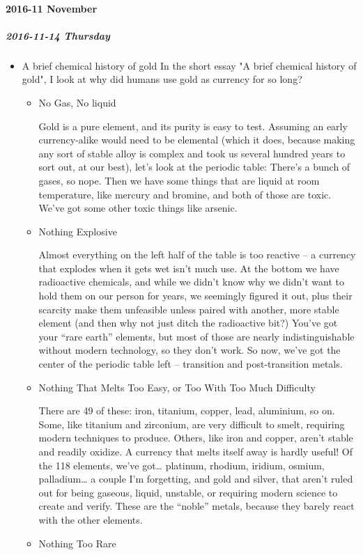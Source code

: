 \documentclass[11pt]{article}
\begin{document}
\paragraph*{2016-11 November}
\label{sec:org72089d9}
\startcontents[level-4]
\subparagraph*{2016-11-14 Thursday}
\label{sec:org6317ebd}
\begin{itemize}
\item A brief chemical history of gold
\label{sec:orgc4d97cb}
In the short essay "A brief chemical history of gold", I look at why did humans use gold as currency for so long?
\begin{itemize}
\item No Gas, No liquid
\label{sec:org07710a9}

Gold is a pure element, and its purity is easy to test. Assuming an early currency-alike would need to be elemental (which it does, because making any sort of stable alloy is complex and took us several hundred years to sort out, at our best), let’s look at the periodic table: There’s a bunch of gases, so nope. Then we have some things that are liquid at room temperature, like mercury and bromine, and both of those are toxic. We’ve got some other toxic things like arsenic.
\item Nothing Explosive
\label{sec:orga9853b1}

Almost everything on the left half of the table is too reactive – a currency that explodes when it gets wet isn’t much use. At the bottom we have radioactive chemicals, and while we didn’t know why we didn’t want to hold them on our person for years, we seemingly figured it out, plus their scarcity make them unfeasible unless paired with another, more stable element (and then why not just ditch the radioactive bit?) You’ve got your “rare earth” elements, but most of those are nearly indistinguishable without modern technology, so they don’t work. So now, we’ve got the center of the periodic table left – transition and post-transition metals.
\item Nothing That Melts Too Easy, or Too With Too Much Difficulty
\label{sec:org58afaac}

There are 49 of these: iron, titanium, copper, lead, aluminium, so on. Some, like titanium and zirconium, are very difficult to smelt, requiring modern techniques to produce. Others, like iron and copper, aren’t stable and readily oxidize. A currency that melts itself away is hardly useful! Of the 118 elements, we’ve got… platinum, rhodium, iridium, osmium, palladium… a couple I’m forgetting, and gold and silver, that aren’t ruled out for being gaseous, liquid, unstable, or requiring modern science to create and verify. These are the “noble” metals, because they barely react with the other elements.
\item Nothing Too Rare
\label{sec:org30ed7e6}


\end{itemize}
\end{itemize}
\end{document}
